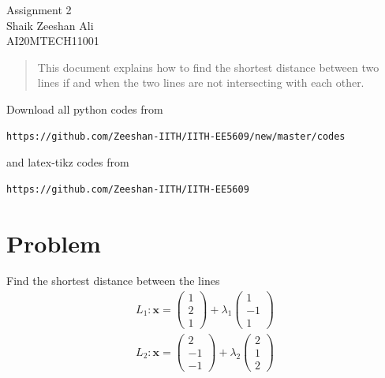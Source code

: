 \documentclass[journal,12pt,twocolumn]{IEEEtran}
\newcommand{\myvec}[1]{\ensuremath{\begin{pmatrix}#1\end{pmatrix}}}
\numberwithin{equation}{subsection}
\let\vec\mathbf
\begin{document}
\begin{center}
\huge Assignment 2\\

\large Shaik Zeeshan Ali\\
\large AI20MTECH11001\\
\end{center}
\begin{abstract}
This document explains how to find the shortest distance between two lines if and when the two lines are not intersecting with each other.
\end{abstract}
\vspace{0.5cm}
Download all python codes from 
\begin{lstlisting}
https://github.com/Zeeshan-IITH/IITH-EE5609/new/master/codes
\end{lstlisting}
%
and latex-tikz codes from 
\begin{lstlisting}
https://github.com/Zeeshan-IITH/IITH-EE5609
\end{lstlisting}

\section{Problem}
Find the shortest distance between the lines \\
\begin{align}
    L_1\colon \vec{x}=\myvec{1\\2\\1}+\lambda_1\myvec{1\\-1\\1}\\
    L_2\colon \vec{x}=\myvec{2\\-1\\-1}+\lambda_2\myvec{2\\1\\2}
\end{align}
\end{document}
